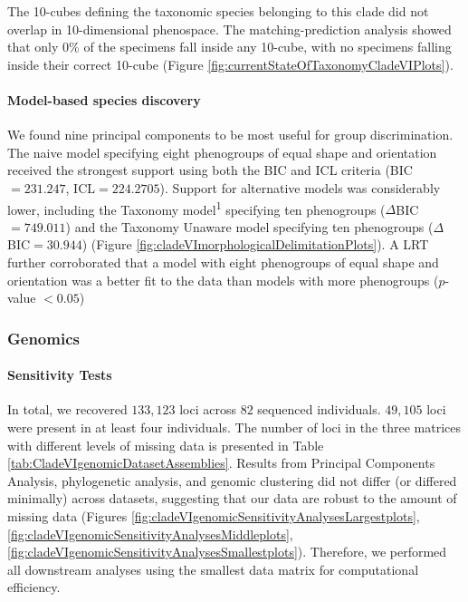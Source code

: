\documentclass[
  11pt,
]{article}
\begin{document}
The 10-cubes defining the taxonomic species belonging to this clade did not overlap in 10-dimensional phenospace. The matching-prediction analysis showed that only \(0\)\% of the specimens fall inside any 10-cube, with no specimens falling inside their correct 10-cube (Figure \ref{fig:currentStateOfTaxonomyCladeVIPlots}).

\hypertarget{model-based-species-discovery-10}{%
\paragraph{Model-based species discovery}\label{model-based-species-discovery-10}}

We found nine principal components to be most useful for group discrimination. The naive model specifying eight phenogroups of equal shape and orientation received the strongest support using both the BIC and ICL criteria (BIC\(=231.247\), ICL\(=224.2705\)). Support for alternative models was considerably lower, including the Taxonomy model\textsuperscript{1} specifying ten phenogroups (\(\Delta\)BIC\(=749.011\)) and the Taxonomy Unaware model specifying ten phenogroups (\(\Delta\)BIC\(=30.944\)) (Figure \ref{fig:cladeVImorphologicalDelimitationPlots}). A LRT further corroborated that a model with eight phenogroups of equal shape and orientation was a better fit to the data than models with more phenogroups (\(p\)-value \(<0.05\))

\hypertarget{genomics-6}{%
\subsubsection{Genomics}\label{genomics-6}}

\hypertarget{sensitivity-tests-5}{%
\paragraph{Sensitivity Tests}\label{sensitivity-tests-5}}

In total, we recovered \(133,123\) loci across \(82\) sequenced individuals. \(49,105\) loci were present in at least four individuals. The number of loci in the three matrices with different levels of missing data is presented in Table \ref{tab:CladeVIgenomicDatasetAssemblies}. Results from Principal Components Analysis, phylogenetic analysis, and genomic clustering did not differ (or differed minimally) across datasets, suggesting that our data are robust to the amount of missing data (Figures \ref{fig:cladeVIgenomicSensitivityAnalysesLargestplots}, \ref{fig:cladeVIgenomicSensitivityAnalysesMiddleplots}, \ref{fig:cladeVIgenomicSensitivityAnalysesSmallestplots}). Therefore, we performed all downstream analyses using the smallest data matrix for computational efficiency.
\end{document}
